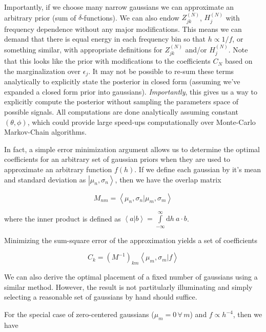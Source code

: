 \documentclass[10pt]{article}
\begin{document}
Importantly, if we choose many narrow gaussians we can approximate an arbitrary prior (sum of $\delta$-functions). We can also endow $Z^{(N)}_{jk}$, $H^{(N)}_{j}$ with frequency dependence without any major modifications. This means we can demand that there is equal energy in each frequency bin so that $h\propto1/f$, or something similar, with appropriate definitions for $Z^{(N)}_{jk}$ and/or $H^{(N)}_j$. Note that this looks like the prior with modifications to the coefficients $C_N$ based on the marginalization over $\epsilon_j$. It may not be possible to re-sum these terms analytically to explicitly state the posterior in closed form (assuming we've expanded a closed form prior into gaussians). \emph{Importantly}, this gives us a way to explicitly compute the posterior without sampling the parameters space of possible signals. All computations are done analytically assuming constant $(\theta,\phi)$, which could provide large speed-ups computationally over Monte-Carlo Markov-Chain algorithms.

In fact, a simple error minimization argument allows us to determine the optimal coefficients for an arbitrary set of gaussian priors when they are used to approximate an arbitrary function $f(h)$. If we define each gaussian by it's mean and standard deviation as $\left|\mu_n,\sigma_n\right>$, then we have the overlap matrix

\begin{equation}
M_{nm} = \left<\mu_n,\sigma_n|\mu_m,\sigma_m\right>
\end{equation}

where the inner product is defined as $\left<a|b\right>=\int\limits_{-\infty}^{\infty}\mathrm{d}h\ a\cdot b$.

Minimizing the sum-square error of the approximation yields a set of coefficients

\begin{equation}
C_k = \left(M^{-1}\right)_{km}\left<\mu_m,\sigma_m|f\right>
\end{equation}

We can also derive the optimal placement of a fixed number of gaussians using a similar method. However, the result is not partitularly illuminating and simply selecting a reasonable set of gaussians by hand should suffice.

For the special case of zero-centered gaussians ($\mu_m=0\,\forall\,m$) and $f\propto h^{-4}$, then we have
\end{document}
